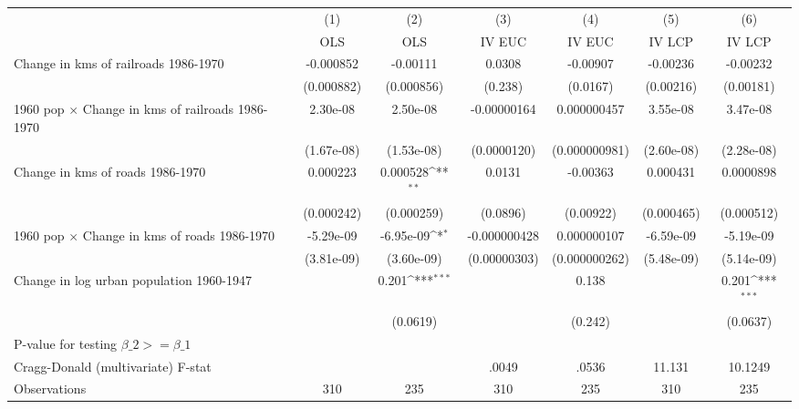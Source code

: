 {
\def\sym#1{\ifmmode^{#1}\else\(^{#1}\)\fi}
\begin{tabular}{l*{6}{c}}
\hline\hline
                &\multicolumn{1}{c}{(1)}&\multicolumn{1}{c}{(2)}&\multicolumn{1}{c}{(3)}&\multicolumn{1}{c}{(4)}&\multicolumn{1}{c}{(5)}&\multicolumn{1}{c}{(6)}\\
                &\multicolumn{1}{c}{OLS}&\multicolumn{1}{c}{OLS}&\multicolumn{1}{c}{IV EUC}&\multicolumn{1}{c}{IV EUC}&\multicolumn{1}{c}{IV LCP}&\multicolumn{1}{c}{IV LCP}\\
\hline
Change in kms of railroads 1986-1970&-0.000852         & -0.00111         &   0.0308         & -0.00907         & -0.00236         & -0.00232         \\
                &(0.000882)         &(0.000856)         &  (0.238)         & (0.0167)         &(0.00216)         &(0.00181)         \\
[1em]
1960 pop $\times$ Change in kms of railroads 1986-1970& 2.30e-08         & 2.50e-08         &-0.00000164         &0.000000457         & 3.55e-08         & 3.47e-08         \\
                &(1.67e-08)         &(1.53e-08)         &(0.0000120)         &(0.000000981)         &(2.60e-08)         &(2.28e-08)         \\
[1em]
Change in kms of roads 1986-1970& 0.000223         & 0.000528\sym{**} &   0.0131         & -0.00363         & 0.000431         &0.0000898         \\
                &(0.000242)         &(0.000259)         & (0.0896)         &(0.00922)         &(0.000465)         &(0.000512)         \\
[1em]
1960 pop $\times$ Change in kms of roads 1986-1970&-5.29e-09         &-6.95e-09\sym{*}  &-0.000000428         &0.000000107         &-6.59e-09         &-5.19e-09         \\
                &(3.81e-09)         &(3.60e-09)         &(0.00000303)         &(0.000000262)         &(5.48e-09)         &(5.14e-09)         \\
[1em]
Change in log urban population 1960-1947&                  &    0.201\sym{***}&                  &    0.138         &                  &    0.201\sym{***}\\
                &                  & (0.0619)         &                  &  (0.242)         &                  & (0.0637)         \\
\hline
P-value for testing $\beta\_{2} >= \beta\_{1}$&                  &                  &                  &                  &                  &                  \\
Cragg-Donald (multivariate) F-stat&                  &                  &    .0049         &    .0536         &   11.131         &  10.1249         \\
Observations    &      310         &      235         &      310         &      235         &      310         &      235         \\
\hline\hline
\end{tabular}
}
